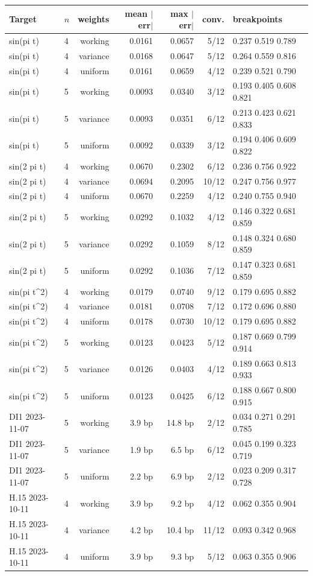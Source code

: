 \begin{tabular}{@{}llrrrrl@{}}
\toprule
Target & $n$ & weights & mean $|$err$|$ & max $|$err$|$ & conv. & breakpoints \\
\midrule
sin(pi t) & 4 & working & 0.0161 & 0.0657 & 5/12 & 0.237 0.519 0.789 \\
sin(pi t) & 4 & variance & 0.0168 & 0.0647 & 5/12 & 0.264 0.559 0.816 \\
sin(pi t) & 4 & uniform & 0.0161 & 0.0659 & 4/12 & 0.239 0.521 0.790 \\
sin(pi t) & 5 & working & 0.0093 & 0.0340 & 3/12 & 0.193 0.405 0.608 0.821 \\
sin(pi t) & 5 & variance & 0.0093 & 0.0351 & 6/12 & 0.213 0.423 0.621 0.833 \\
sin(pi t) & 5 & uniform & 0.0092 & 0.0339 & 3/12 & 0.194 0.406 0.609 0.822 \\
sin(2 pi t) & 4 & working & 0.0670 & 0.2302 & 6/12 & 0.236 0.756 0.922 \\
sin(2 pi t) & 4 & variance & 0.0694 & 0.2095 & 10/12 & 0.247 0.756 0.977 \\
sin(2 pi t) & 4 & uniform & 0.0670 & 0.2259 & 4/12 & 0.240 0.755 0.940 \\
sin(2 pi t) & 5 & working & 0.0292 & 0.1032 & 4/12 & 0.146 0.322 0.681 0.859 \\
sin(2 pi t) & 5 & variance & 0.0292 & 0.1059 & 8/12 & 0.148 0.324 0.680 0.859 \\
sin(2 pi t) & 5 & uniform & 0.0292 & 0.1036 & 7/12 & 0.147 0.323 0.681 0.859 \\
sin(pi t^2) & 4 & working & 0.0179 & 0.0740 & 9/12 & 0.179 0.695 0.882 \\
sin(pi t^2) & 4 & variance & 0.0181 & 0.0708 & 7/12 & 0.172 0.696 0.880 \\
sin(pi t^2) & 4 & uniform & 0.0178 & 0.0730 & 10/12 & 0.179 0.695 0.882 \\
sin(pi t^2) & 5 & working & 0.0123 & 0.0423 & 5/12 & 0.187 0.669 0.799 0.914 \\
sin(pi t^2) & 5 & variance & 0.0126 & 0.0403 & 4/12 & 0.189 0.663 0.813 0.933 \\
sin(pi t^2) & 5 & uniform & 0.0123 & 0.0425 & 6/12 & 0.188 0.667 0.800 0.915 \\
DI1 2023-11-07 & 5 & working & 3.9 bp & 14.8 bp & 2/12 & 0.034 0.271 0.291 0.785 \\
DI1 2023-11-07 & 5 & variance & 1.9 bp & 6.5 bp & 6/12 & 0.045 0.199 0.323 0.719 \\
DI1 2023-11-07 & 5 & uniform & 2.2 bp & 6.9 bp & 2/12 & 0.023 0.209 0.317 0.728 \\
H.15 2023-10-11 & 4 & working & 3.9 bp & 9.2 bp & 4/12 & 0.062 0.355 0.904 \\
H.15 2023-10-11 & 4 & variance & 4.2 bp & 10.4 bp & 11/12 & 0.093 0.342 0.968 \\
H.15 2023-10-11 & 4 & uniform & 3.9 bp & 9.3 bp & 5/12 & 0.063 0.355 0.906 \\
\bottomrule
\end{tabular}
